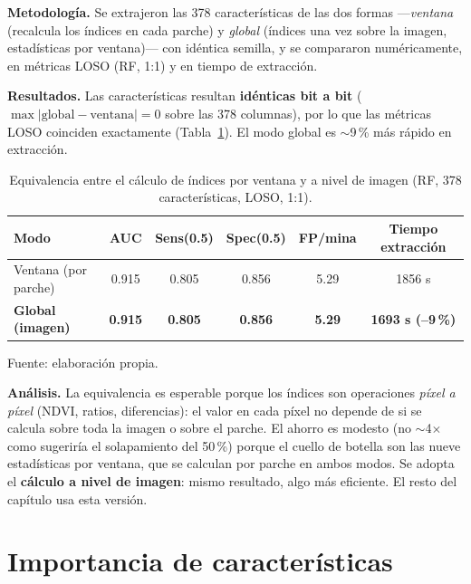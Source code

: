 \textbf{Metodología.} Se extrajeron las 378 características de las dos formas
---\emph{ventana} (recalcula los índices en cada parche) y \emph{global}
(índices una vez sobre la imagen, estadísticas por ventana)--- con idéntica
semilla, y se compararon numéricamente, en métricas \ac{LOSO} (\ac{RF}, 1:1) y
en tiempo de extracción.

\textbf{Resultados.} Las características resultan \textbf{idénticas bit a bit}
($\max|\text{global}-\text{ventana}| = 0$ sobre las 378 columnas), por lo que las
métricas \ac{LOSO} coinciden exactamente (Tabla~\ref{tab:indices_modo}). El modo
global es $\sim$9\,\% más rápido en extracción.

\begin{table}[H]
\centering
\caption{Equivalencia entre el cálculo de índices por ventana y a nivel de imagen
         (\ac{RF}, 378 características, \ac{LOSO}, 1:1).}
\label{tab:indices_modo}
\small
\begin{tabular}{lccccc}
\toprule
\textbf{Modo} & \textbf{AUC} & \textbf{Sens(0.5)} & \textbf{Spec(0.5)} &
\textbf{FP/mina} & \textbf{Tiempo extracción} \\
\midrule
Ventana (por parche) & 0.915 & 0.805 & 0.856 & 5.29 & 1856 s \\
\textbf{Global (imagen)} & \textbf{0.915} & \textbf{0.805} & \textbf{0.856} &
\textbf{5.29} & \textbf{1693 s (--9\,\%)} \\
\bottomrule
\end{tabular}

  {\footnotesize Fuente: elaboración propia.}
\end{table}

\textbf{Análisis.} La equivalencia es esperable porque los índices son
operaciones \emph{píxel a píxel} (NDVI, ratios, diferencias): el valor en cada
píxel no depende de si se calcula sobre toda la imagen o sobre el parche. El
ahorro es modesto (no $\sim$4$\times$ como sugeriría el solapamiento del 50\,\%)
porque el cuello de botella son las nueve estadísticas por ventana, que se
calculan por parche en ambos modos. Se adopta el \textbf{cálculo a nivel de
imagen}: mismo resultado, algo más eficiente. El resto del capítulo usa esta
versión.

\section{Importancia de características}
\label{sec:importancia}

